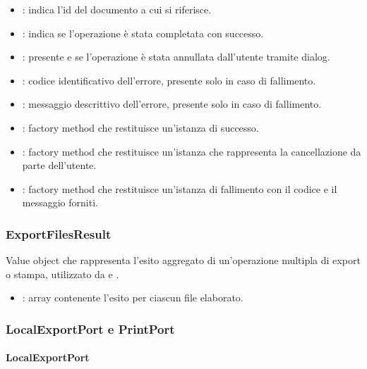 \begin{itemize}
    \item {}: indica l'id del documento a cui si riferisce.
    \item {} : indica se l'operazione è stata 
    completata con successo.
    \item {} : presente e  se 
    l'operazione è stata annullata dall'utente tramite dialog.
    \item {} : codice identificativo dell'errore, 
    presente solo in caso di fallimento.
    \item {} : messaggio descrittivo 
    dell'errore, presente solo in caso di fallimento.
    \item {} : factory method che 
    restituisce un'istanza di successo.
    \item {} : factory method che 
    restituisce un'istanza che rappresenta la cancellazione da parte 
    dell'utente.
    \item {} : factory method che restituisce un'istanza di fallimento 
    con il codice e il messaggio forniti.
\end{itemize}

\subsubsection{ExportFilesResult}

Value object che rappresenta l'esito aggregato di un'operazione multipla di 
export o stampa, utilizzato da  e 
.

\begin{itemize}
    \item {} : array contenente l'esito 
    per ciascun file elaborato.
\end{itemize}

\subsubsection{LocalExportPort e PrintPort}

\paragraph{LocalExportPort}

